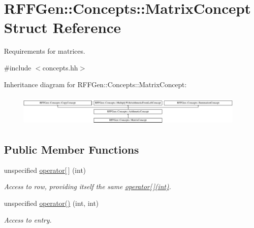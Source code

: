 \hypertarget{structRFFGen_1_1Concepts_1_1MatrixConcept}{\section{R\-F\-F\-Gen\-:\-:Concepts\-:\-:Matrix\-Concept Struct Reference}
\label{structRFFGen_1_1Concepts_1_1MatrixConcept}
}


Requirements for matrices.  




{\ttfamily \#include $<$concepts.\-hh$>$}

Inheritance diagram for R\-F\-F\-Gen\-:\-:Concepts\-:\-:Matrix\-Concept\-:\begin{figure}[H]
\begin{center}
\leavevmode
\includegraphics[height=1.586402cm]{structRFFGen_1_1Concepts_1_1MatrixConcept}
\end{center}
\end{figure}
\subsection*{Public Member Functions}
\begin{DoxyCompactItemize}
\item 
\hypertarget{structRFFGen_1_1Concepts_1_1MatrixConcept_a9edaafd682629e350028a6d943f98a2d}{unspecified \hyperlink{structRFFGen_1_1Concepts_1_1MatrixConcept_a9edaafd682629e350028a6d943f98a2d}{operator\mbox{[}$\,$\mbox{]}} (int)}\label{structRFFGen_1_1Concepts_1_1MatrixConcept_a9edaafd682629e350028a6d943f98a2d}

\begin{DoxyCompactList}\small\item\em Access to row, providing itself the same \hyperlink{structRFFGen_1_1Concepts_1_1MatrixConcept_a9edaafd682629e350028a6d943f98a2d}{operator\mbox{[}$\,$\mbox{]}(int)}. \end{DoxyCompactList}\item 
\hypertarget{structRFFGen_1_1Concepts_1_1MatrixConcept_a2f067ad171c8a9678b77fea11b6e7ec4}{unspecified \hyperlink{structRFFGen_1_1Concepts_1_1MatrixConcept_a2f067ad171c8a9678b77fea11b6e7ec4}{operator()} (int, int)}\label{structRFFGen_1_1Concepts_1_1MatrixConcept_a2f067ad171c8a9678b77fea11b6e7ec4}

\begin{DoxyCompactList}\small\item\em Access to entry. \end{DoxyCompactList}\end{DoxyCompactItemize}


